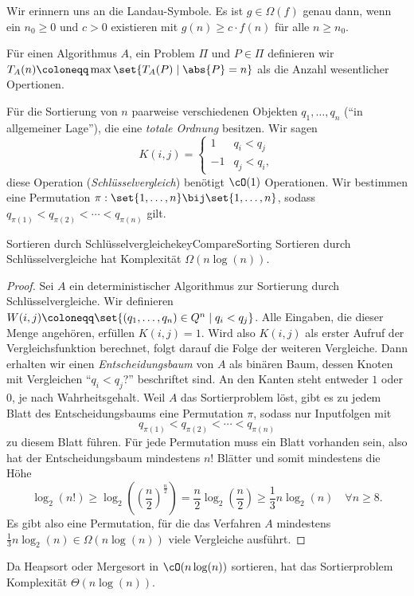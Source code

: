 \documentclass[language=ngerman,algolist,acrolist]{TemplateLecture}
\begin{document}
Wir erinnern uns an die Landau-Symbole. Es ist $g \in \Omega(f)$ genau dann, wenn ein $n_0 \geq 0$ und $c > 0$ existieren mit $g(n) \geq c \cdot f(n)$ für alle $n \geq n_0$.

Für einen Algorithmus $A$, ein Problem $\Pi$ und $P \in \Pi$ definieren wir $T_A(n) \coloneqq \max\set{T_A(P) \mid \abs{P} = n}$ als die Anzahl wesentlicher Opertionen.

Für die Sortierung von $n$ paarweise verschiedenen Objekten $q_1, \ldots, q_n$ (\enquote{in allgemeiner Lage}), die eine \emph{totale Ordnung} besitzen. Wir sagen
\begin{equation*}
    K(i, j) = \begin{cases}
        1 & q_i < q_j \\ 
        -1 & q_j < q_i,
    \end{cases}
\end{equation*}
diese Operation (\emph{Schlüsselvergleich}) benötigt $\cO(1)$ Operationen. Wir bestimmen eine Permutation $\pi: \set{1,\ldots,n} \bij \set{1,\ldots,n}$, sodass $q_{\pi(1)} < q_{\pi(2)} < \cdots < q_{\pi(n)}$ gilt.

\begin{thm}{Sortieren durch Schlüsselvergleiche}{keyCompareSorting}
    Sortieren durch Schlüsselvergleiche hat Komplexität $\Omega(n \log(n))$.
\end{thm}

\begin{proof}
    Sei $A$ ein deterministischer Algorithmus zur Sortierung durch Schlüsselvergleiche. Wir definieren $W(i, j) \coloneqq \set{(q_1, \ldots, q_n) \in Q^n \mid q_i < q_j}$. Alle Eingaben, die dieser Menge angehören, erfüllen $K(i, j) = 1$. Wird also $K(i, j)$ als erster Aufruf der Vergleichsfunktion berechnet, folgt darauf die Folge der weiteren Vergleiche.  Dann erhalten wir einen \emph{Entscheidungsbaum} von $A$ als binären Baum, dessen Knoten mit Vergleichen \enquote{$q_i < q_j$?} beschriftet sind. An den Kanten steht entweder $1$ oder $0$, je nach Wahrheitsgehalt. Weil $A$ das Sortierproblem löst, gibt es zu jedem Blatt des Entscheidungsbaums eine Permutation $\pi$, sodass nur Inputfolgen mit 
    \begin{equation*}
        q_{\pi(1)} < q_{\pi(2)} < \cdots < q_{\pi(n)}
    \end{equation*}
    zu diesem Blatt führen. Für jede Permutation muss ein Blatt vorhanden sein, also hat der Entscheidungsbaum mindestens $n!$ Blätter und somit mindestens die Höhe 
    \begin{equation*}
        \log_2(n!) \geq \log_2\left( \left( \frac{n}{2} \right)^{\frac{n}{2}} \right) = \frac{n}{2} \log_2\left( \frac{n}{2} \right) \geq \frac{1}{3}n \log_2(n) \quad \forall n \geq 8.
    \end{equation*}
    Es gibt also eine Permutation, für die das Verfahren $A$ mindestens $\frac{1}{3}n \log_2(n) \in \Omega(n \log(n))$ viele Vergleiche ausführt.
\end{proof}
Da Heapsort oder Mergesort in $\cO(n \log(n))$ sortieren, hat das Sortierproblem Komplexität $\Theta(n \log(n))$.
\end{document}
